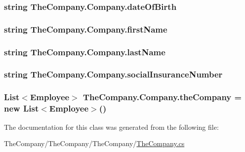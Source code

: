 \subsubsection[{date\+Of\+Birth}]{\setlength{\rightskip}{0pt plus 5cm}string The\+Company.\+Company.\+date\+Of\+Birth}\label{class_the_company_1_1_company_af1f444cbde9ffb5cce862ded889095a9}
\hypertarget{class_the_company_1_1_company_ac8e2b17c2cb8d2827316bdd94315656d}{}
\subsubsection[{first\+Name}]{\setlength{\rightskip}{0pt plus 5cm}string The\+Company.\+Company.\+first\+Name}\label{class_the_company_1_1_company_ac8e2b17c2cb8d2827316bdd94315656d}
\hypertarget{class_the_company_1_1_company_a8b7079edba0fc7a04a7b3b3c96146f41}{}
\subsubsection[{last\+Name}]{\setlength{\rightskip}{0pt plus 5cm}string The\+Company.\+Company.\+last\+Name}\label{class_the_company_1_1_company_a8b7079edba0fc7a04a7b3b3c96146f41}
\hypertarget{class_the_company_1_1_company_a3d40e1c556b2289dc7e902712fc83d9f}{}
\subsubsection[{social\+Insurance\+Number}]{\setlength{\rightskip}{0pt plus 5cm}string The\+Company.\+Company.\+social\+Insurance\+Number}\label{class_the_company_1_1_company_a3d40e1c556b2289dc7e902712fc83d9f}
\hypertarget{class_the_company_1_1_company_a86ea0aad0b1c1aeb0dcb952149b10c4f}{}
\subsubsection[{the\+Company}]{\setlength{\rightskip}{0pt plus 5cm}List$<$Employee$>$ The\+Company.\+Company.\+the\+Company = new List$<$Employee$>$()\hspace{0.3cm}{\ttfamily [private]}}\label{class_the_company_1_1_company_a86ea0aad0b1c1aeb0dcb952149b10c4f}


The documentation for this class was generated from the following file\+:\begin{DoxyCompactItemize}
\item 
The\+Company/\+The\+Company/\+The\+Company/\hyperlink{_the_company_8cs}{The\+Company.\+cs}\end{DoxyCompactItemize}
